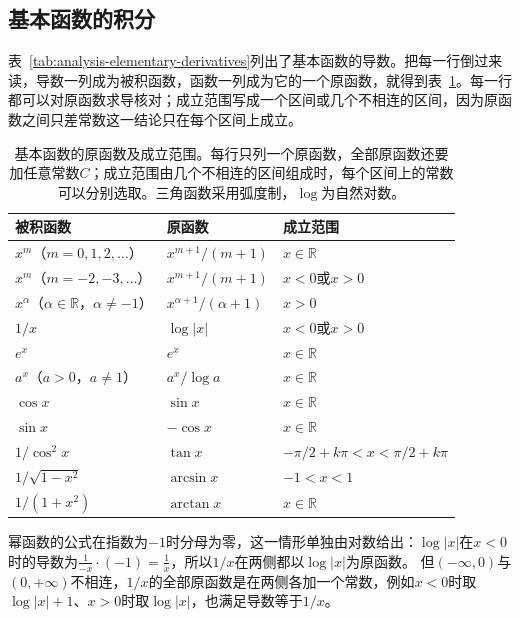 \subsection{基本函数的积分}
\label{sec:ru-basic-antiderivatives}

表~\ref{tab:analysis-elementary-derivatives}列出了基本函数的导数。把每一行倒过来读，导数一列成为被积函数，函数一列成为它的一个原函数，就得到表~\ref{tab:ru-elementary-antiderivatives}。每一行都可以对原函数求导核对；成立范围写成一个区间或几个不相连的区间，因为原函数之间只差常数这一结论只在每个区间上成立。

\begin{table}[htbp]
 \centering\small
 \begin{tabular}{@{}lll@{}}
 \toprule
 被积函数 & 原函数 & 成立范围\\
 \midrule
 $x^m$（$m=0,1,2,\dots$） & $x^{m+1}/(m+1)$ & $x\in\mathbb R$\\
 $x^m$（$m=-2,-3,\dots$） & $x^{m+1}/(m+1)$ & $x<0$或$x>0$\\
 $x^\alpha$（$\alpha\in\mathbb R$，$\alpha\neq-1$） & $x^{\alpha+1}/(\alpha+1)$ & $x>0$\\
 $1/x$ & $\log|x|$ & $x<0$或$x>0$\\
 $e^x$ & $e^x$ & $x\in\mathbb R$\\
 $a^x$（$a>0$，$a\neq1$） & $a^x/\log a$ & $x\in\mathbb R$\\
 $\cos x$ & $\sin x$ & $x\in\mathbb R$\\
 $\sin x$ & $-\cos x$ & $x\in\mathbb R$\\
 $1/\cos^2x$ & $\tan x$ & $-\pi/2+k\pi<x<\pi/2+k\pi$\\
 $1/\sqrt{1-x^2}$ & $\arcsin x$ & $-1<x<1$\\
 $1/(1+x^2)$ & $\arctan x$ & $x\in\mathbb R$\\
 \bottomrule
 \end{tabular}
 \caption{基本函数的原函数及成立范围。每行只列一个原函数，全部原函数还要加任意常数$C$；成立范围由几个不相连的区间组成时，每个区间上的常数可以分别选取。三角函数采用弧度制，$\log$为自然对数。}
 \label{tab:ru-elementary-antiderivatives}
\end{table}

幂函数的公式在指数为$-1$时分母为零，这一情形单独由对数给出：$\log|x|$在$x<0$时的导数为$\frac{1}{-x}\cdot(-1)=\frac1x$，所以$1/x$在两侧都以$\log|x|$为原函数。
但$(-\infty,0)$与$(0,+\infty)$不相连，$1/x$的全部原函数是在两侧各加一个常数，例如$x<0$时取$\log|x|+1$、$x>0$时取$\log|x|$，也满足导数等于$1/x$。

